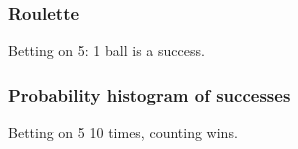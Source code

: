 \documentclass[handout]{beamer}
\begin{document}


   \begin{frame}
   \frametitle{Roulette}
   \begin{center}
   \end{center}
   Betting on {\color{red} 5}: 1 ball is a success.
   \end{frame}



   \begin{frame}
   \frametitle{Probability histogram of successes}
   \begin{center}
   \end{center}
   Betting on {\color{red} 5} 10 times, counting wins.
   \end{frame}
\end{document}

